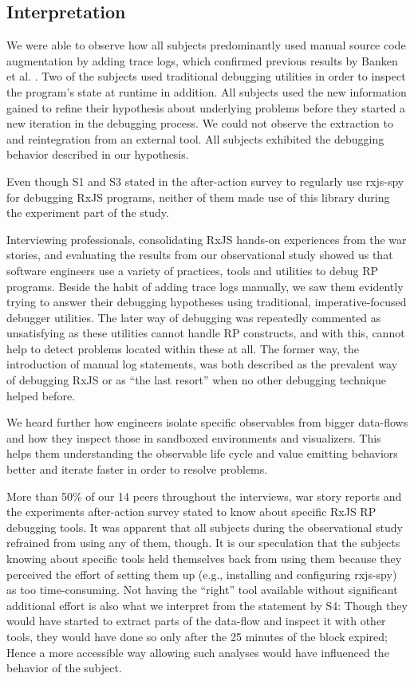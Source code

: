 \documentclass[sigplan,screen,review]{acmart}
\begin{document}
\subsection{Interpretation}

We were able to observe how all subjects predominantly used manual source code augmentation by adding trace logs, which confirmed previous results by Banken et al. \cite{10.1145/3180155.3180156}. Two of the subjects used traditional debugging utilities in order to inspect the program's state at runtime in addition. All subjects used the new information gained to refine their hypothesis about underlying problems before they started a new iteration in the debugging process. We could not observe the extraction to and reintegration from an external tool. All subjects exhibited the debugging behavior described in our hypothesis.

Even though S1 and S3 stated in the after-action survey to regularly use rxjs-spy for debugging RxJS programs, neither of them made use of this library during the experiment part of the study.

Interviewing professionals, consolidating RxJS hands-on experiences from the war stories, and evaluating the results from our observational study showed us that software engineers use a variety of practices, tools and utilities to debug RP programs. Beside the habit of adding trace logs manually, we saw them evidently trying to answer their debugging hypotheses using traditional, imperative-focused debugger utilities. The later way of debugging was repeatedly commented as unsatisfying as these utilities cannot handle RP constructs, and with this, cannot help to detect problems located within these at all. The former way, the introduction of manual log statements, was both described as the prevalent way of debugging RxJS or as ``the last resort'' when no other debugging technique helped before.

We heard further how engineers isolate specific observables from bigger data-flows and how they inspect those in sandboxed environments and visualizers. This helps them understanding the observable life cycle and value emitting behaviors better and iterate faster in order to resolve problems.

More than 50\% of our 14 peers throughout the interviews, war story reports and the experiments after-action survey stated to know about specific RxJS RP debugging tools. It was apparent that all subjects during the observational study refrained from using any of them, though. It is our speculation that the subjects knowing about specific tools held themselves back from using them because they perceived the effort of setting them up (e.g., installing and configuring rxjs-spy) as too time-consuming. Not having the ``right'' tool available without significant additional effort is also what we interpret from the statement by S4: Though they would have started to extract parts of the data-flow and inspect it with other tools, they would have done so only after the 25 minutes of the block expired; Hence a more accessible way allowing such analyses would have influenced the behavior of the subject.
\end{document}

